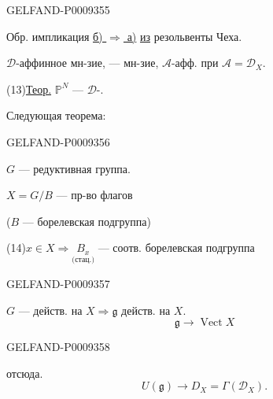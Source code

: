 \begin{GelfandAdjacentEvidence}{GELFAND-P000935}{5}


Обр. импликация \underline{б) $\Rightarrow$ а)} \underline{из} резольвенты Чеха.

$\mathcal D$-аффинное мн-зие, --- мн-зие, $\mathcal A$-афф. при $\mathcal A=\mathcal D_X$.

(13)\quad \underline{Теор.} $\mathbb P^N$ --- $\mathcal D$-.

Следующая теорема:
\end{GelfandAdjacentEvidence}
\begin{GelfandAdjacentEvidence}{GELFAND-P000935}{6}


$G$ --- редуктивная группа.

$X=G/B$ --- пр-во флагов

($B$ --- борелевская подгруппа)

(14)\quad $x\in X\Rightarrow\underset{\text{(стац.)}}{B_x}$ --- соотв. борелевская подгруппа
\end{GelfandAdjacentEvidence}
\begin{GelfandAdjacentEvidence}{GELFAND-P000935}{7}


$G$ --- действ. на $X\Rightarrow\mathfrak g$ действ. на $X$.
\begin{equation*}
 \mathfrak g\longrightarrow\operatorname{Vect}X
 \tag{15}
\end{equation*}
\end{GelfandAdjacentEvidence}
\begin{GelfandAdjacentEvidence}{GELFAND-P000935}{8}


отсюда.
\begin{equation*}
 U(\mathfrak g)\longrightarrow D_X=\Gamma(\mathcal D_X).
 \tag{16}
\end{equation*}

\end{GelfandAdjacentEvidence}
